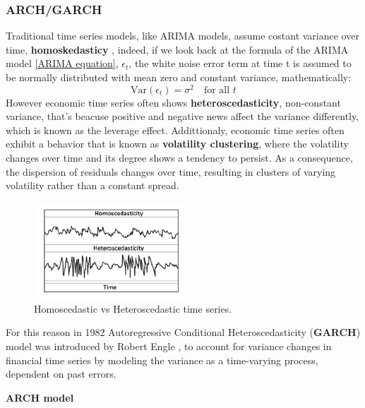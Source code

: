 \subsubsection{ARCH/GARCH}
Traditional time series models, like ARIMA models, assume costant variance over time, \textbf{homoskedasticy} \cite{MeatPrices2023}, indeed, if we look back at the formula of the ARIMA model \eqref{ARIMA equation},  \(\epsilon_t\), the white noise error term at time t is assumed to be normally distributed with mean zero and constant variance, mathematically: 
\begin{equation}
\text{Var}(\epsilon_t) = \sigma^2 \quad \text{for all } t
\end{equation}
However economic time series often shows \textbf{heteroscedasticity}, non-constant variance, that's beacuse  positive and negative news affect the variance
differently, which is known as the leverage effect. Addittionaly, economic time series often exhibit a behavior that is known as \textbf{volatility clustering}, where the volatility changes over time and its degree shows a tendency to persist. As a consequence, the dispersion of residuals changes over time, resulting in clusters of varying volatility rather than a constant spread.
\begin{figure}[H] 
    \centering
    \includegraphics[width=0.5\textwidth]{Machine_learning_thesis/Images/Homoscedastic-vs-Heteroscedastic.png}
    \caption{Homoscedastic vs Heteroscedastic time series.} 
    \label{fig:Homoscedastic-vs-Heteroscedastic} 
\end{figure}
For this reason in 1982 Autoregressive Conditional Heteroscedasticity (\textbf{GARCH}) model was introduced by Robert Engle \cite{Engle1982}, to account for variance changes in financial time series by modeling the variance as a time-varying process, dependent on past errors. 

\textbf{ARCH model}

